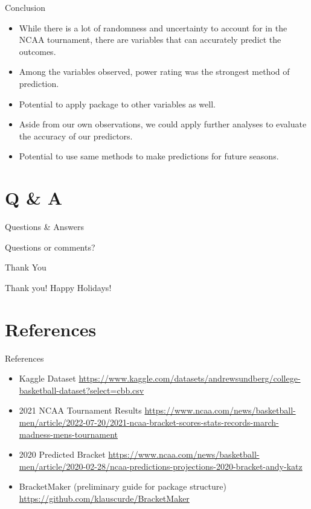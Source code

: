 \documentclass{beamer}
\begin{document}
\begin{frame}{Conclusion}
\begin{itemize}
  \item While there is a lot of randomness and uncertainty to account for in the NCAA tournament, there are variables that can accurately predict the outcomes.
  \item Among the variables observed, power rating was the strongest method of prediction.
  \item Potential to apply package to other variables as well.
  \item Aside from our own observations, we could apply further analyses to evaluate the accuracy of our predictors.
  \item Potential to use same methods to make predictions for future seasons.
\end{itemize}
\end{frame}

\section{Q \& A}

\begin{frame}{Questions \& Answers}
\begin{center}
\Huge Questions or comments?
\end{center}
\end{frame}

\begin{frame}{Thank You}
\begin{center}
\Huge Thank you! Happy Holidays!
\end{center}
\end{frame}

\section{References}
\begin{frame}{References}
  \begin{itemize}
    \item Kaggle Dataset
    \href{https://www.kaggle.com/datasets/andrewsundberg/college-basketball-dataset?select=cbb.csv}{https://www.kaggle.com/datasets/andrewsundberg/college-basketball-dataset?select=cbb.csv}
    \item 2021 NCAA Tournament Results
    \href{https://www.ncaa.com/news/basketball-men/article/2022-07-20/2021-ncaa-bracket-scores-stats-records-march-madness-mens-tournament}{https://www.ncaa.com/news/basketball-men/article/2022-07-20/2021-ncaa-bracket-scores-stats-records-march-madness-mens-tournament}
    \item 2020 Predicted Bracket
    \href{https://www.ncaa.com/news/basketball-men/article/2020-02-28/ncaa-predictions-projections-2020-bracket-andy-katz}{https://www.ncaa.com/news/basketball-men/article/2020-02-28/ncaa-predictions-projections-2020-bracket-andy-katz}
    \item BracketMaker (preliminary guide for package structure)
    \href{https://github.com/klauscurde/BracketMaker}{https://github.com/klauscurde/BracketMaker}
  \end{itemize}
  \end{frame}
\end{document}
